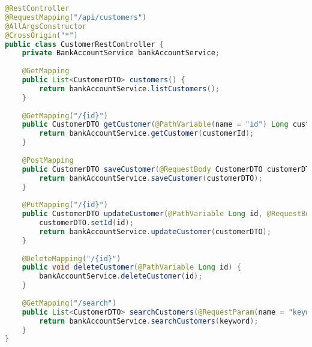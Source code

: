 \documentclass[12pt,a4paper]{report}
\begin{document}
\begin{lstlisting}[language=Java, caption=CustomerRestController.java]
@RestController
@RequestMapping("/api/customers")
@AllArgsConstructor
@CrossOrigin("*")
public class CustomerRestController {
    private BankAccountService bankAccountService;
    
    @GetMapping
    public List<CustomerDTO> customers() {
        return bankAccountService.listCustomers();
    }
    
    @GetMapping("/{id}")
    public CustomerDTO getCustomer(@PathVariable(name = "id") Long customerId) {
        return bankAccountService.getCustomer(customerId);
    }
    
    @PostMapping
    public CustomerDTO saveCustomer(@RequestBody CustomerDTO customerDTO) {
        return bankAccountService.saveCustomer(customerDTO);
    }
    
    @PutMapping("/{id}")
    public CustomerDTO updateCustomer(@PathVariable Long id, @RequestBody CustomerDTO customerDTO) {
        customerDTO.setId(id);
        return bankAccountService.updateCustomer(customerDTO);
    }
    
    @DeleteMapping("/{id}")
    public void deleteCustomer(@PathVariable Long id) {
        bankAccountService.deleteCustomer(id);
    }
    
    @GetMapping("/search")
    public List<CustomerDTO> searchCustomers(@RequestParam(name = "keyword", defaultValue = "") String keyword) {
        return bankAccountService.searchCustomers(keyword);
    }
}
\end{lstlisting}
\end{document}
